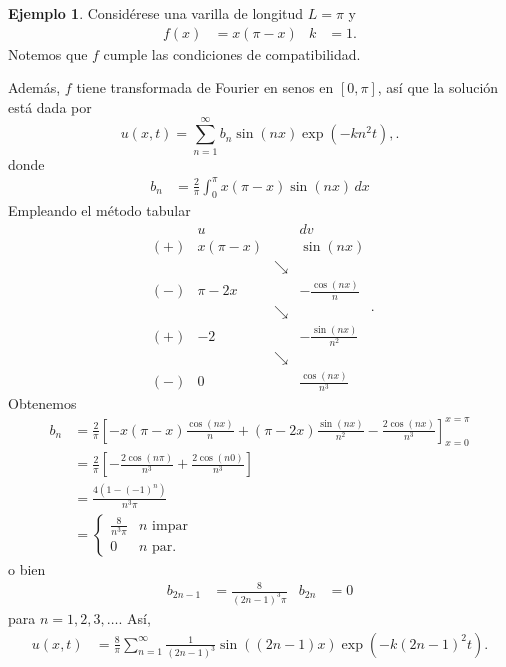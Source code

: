 \documentclass[11pt,letterpaper,draft]{report}
\theoremstyle{plain}
\theoremstyle{definition}
\newtheorem{example}[theorem]{Ejemplo}
\theoremstyle{remark}
\newcommand\<{\langle}
\renewcommand\>{\rangle}
\begin{document}
\begin{example}
  Considérese una varilla de longitud $L=\pi$ y
  \begin{align*}
    f(x)&=x(\pi-x)
    &
    k&=1.
  \end{align*}
  Notemos que $f$ cumple las condiciones de compatibilidad.

  Además, $f$ tiene transformada de Fourier en senos en
  $[0,\pi]$, así que la solución está dada por
  \[
    u(x,t)
    = \sum_{n=1}^{\infty} b_n\sin(nx)\exp(-kn^2t),
  .\]
  donde
  \begin{align*}
    b_n
    &= \frac{2}{\pi}\int_0^\pi x(\pi-x)\sin(nx)\,dx
  \end{align*}
  Empleando el método tabular
  \[
    \begin{array}{c|c|c|c}
      & u & &  dv \\
      (+) & x(\pi-x) & & \sin(nx) \\
      && \searrow \\
      (-) & \pi - 2x && -\frac{\cos(nx)}{n} \\
      && \searrow \\
      (+) & -2 && -\frac{\sin(nx)}{n^2}\\
      && \searrow \\
      (-) & 0 && \frac{\cos(nx)}{n^3}
    \end{array}
  .\]
  Obtenemos
  \begin{align*}
    b_n
    &= \frac{2}{\pi}\left[ -x(\pi-x)\frac{\cos(nx)}{n}
    + (\pi-2x)\frac{\sin(nx)}{n^2}
    - \frac{2\cos(nx)}{n^3}
    \right]_{x=0}^{x=\pi} \\
    &= \frac{2}{\pi}\left[
    -\frac{2\cos(n\pi)}{n^3}+\frac{2\cos(n0)}{n^3}
    \right] \\
    &= \frac{4(1-(-1)^n)}{n^3\pi} \\
    &=
    \begin{cases}
      \displaystyle\frac{8}{n^3\pi} & n \text{ impar } \\
      0 & n \text{ par.}
    \end{cases}
  \end{align*}
  o bien
  \begin{align*}
    b_{2n-1} &= \frac{8}{(2n-1)^3\pi}
    &
    b_{2n}&=0
  \end{align*}
  para $n=1,2,3,\dots$. Así,
  \begin{align*}
    u(x,t)
    &= \frac{8}{\pi}\sum_{n=1}^{\infty}
    \frac{1}{(2n-1)^3}\sin((2n-1)x)\exp(-k(2n-1)^2t).
  \end{align*}
\end{example}
\end{document}
